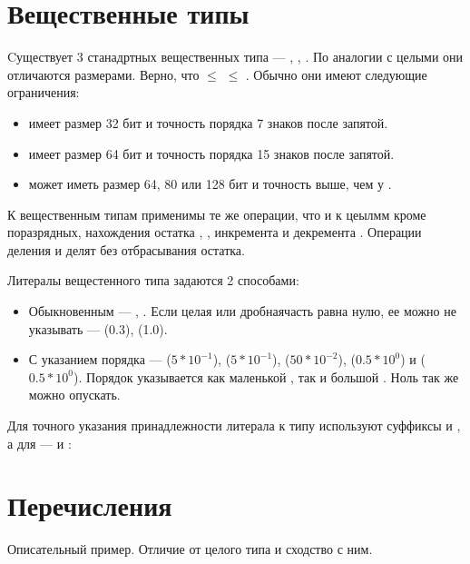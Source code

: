 \documentclass[book.tex]{subfiles}
\begin{document}
\section*{Вещественные типы}

Cуществует 3 станадртных вещественных типа --- , , . По аналогии с целыми они отличаются размерами. Верно, что  $\leq$  $\leq$ . Обычно они имеют следующие ограничения:

\begin{itemize}
\item {} имеет размер 32 бит и точность порядка 7 знаков после запятой.
\item {} имеет размер 64 бит и точность порядка 15 знаков после запятой.
\item {} может иметь размер 64, 80 или 128 бит и точность выше, чем у .
\end{itemize}

К вещественным типам применимы те же операции, что и к цеылмм кроме поразрядных, нахождения остатка \cppword{\%}, \cppword{\%=}, инкремента \cppword{++} и декремента \cppword{--}. Операции деления \cppword{/} и \cppword{/=} делят без отбрасывания остатка.

Литералы вещестенного типа задаются 2 способами:

\begin{itemize}
\item Обыкновенным --- , . Если целая или дробнаячасть равна нулю, ее можно не указывать ---  (0.3),  (1.0).
\item С указанием порядка ---  ($5*10^{-1}$),  ($5*10^{-1}$),  ($50*10^{-2}$),  ($0.5*10^{0}$) и  ($0.5*10^{0}$). Порядок указывается как маленькой , так и большой . Ноль так же можно опускать.
\end{itemize}

Для точного указания принадлежности литерала к типу  используют суффиксы  и , а для  ---  и :


\section*{Перечисления}


Описательный пример. Отличие от целого типа и сходство с ним.
\end{document}
